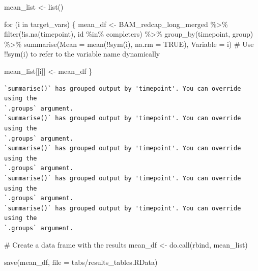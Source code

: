 \documentclass[
  letterpaper,
  DIV=11,
  numbers=noendperiod]{scrreprt}
\newenvironment{Shaded}{\begin{snugshade}}{\end{snugshade}}
\newcommand{\AttributeTok}[1]{\textcolor[rgb]{0.40,0.45,0.13}{#1}}
\newcommand{\CommentTok}[1]{\textcolor[rgb]{0.37,0.37,0.37}{#1}}
\newcommand{\ConstantTok}[1]{\textcolor[rgb]{0.56,0.35,0.01}{#1}}
\newcommand{\ControlFlowTok}[1]{\textcolor[rgb]{0.00,0.23,0.31}{#1}}
\newcommand{\FunctionTok}[1]{\textcolor[rgb]{0.28,0.35,0.67}{#1}}
\newcommand{\NormalTok}[1]{\textcolor[rgb]{0.00,0.23,0.31}{#1}}
\newcommand{\OtherTok}[1]{\textcolor[rgb]{0.00,0.23,0.31}{#1}}
\newcommand{\SpecialCharTok}[1]{\textcolor[rgb]{0.37,0.37,0.37}{#1}}
\newcommand{\StringTok}[1]{\textcolor[rgb]{0.13,0.47,0.30}{#1}}
\begin{document}
\begin{Shaded}
\begin{Highlighting}[]
\NormalTok{mean\_list }\OtherTok{\textless{}{-}} \FunctionTok{list}\NormalTok{()}

\ControlFlowTok{for}\NormalTok{ (i }\ControlFlowTok{in}\NormalTok{ target\_vars) \{ }
\NormalTok{  mean\_df }\OtherTok{\textless{}{-}}\NormalTok{ BAM\_redcap\_long\_merged }\SpecialCharTok{\%\textgreater{}\%}
    \FunctionTok{filter}\NormalTok{(}\SpecialCharTok{!}\FunctionTok{is.na}\NormalTok{(timepoint), id }\SpecialCharTok{\%in\%}\NormalTok{ completers) }\SpecialCharTok{\%\textgreater{}\%}
    \FunctionTok{group\_by}\NormalTok{(timepoint, group) }\SpecialCharTok{\%\textgreater{}\%}
    \FunctionTok{summarise}\NormalTok{(}\AttributeTok{Mean =} \FunctionTok{mean}\NormalTok{(}\SpecialCharTok{!!}\FunctionTok{sym}\NormalTok{(i), }\AttributeTok{na.rm =} \ConstantTok{TRUE}\NormalTok{), }\AttributeTok{Variable =}\NormalTok{ i)  }\CommentTok{\# Use !!sym(i) to refer to the variable name dynamically}
    
\NormalTok{  mean\_list[[i]] }\OtherTok{\textless{}{-}}\NormalTok{ mean\_df}
\NormalTok{\}}
\end{Highlighting}
\end{Shaded}

\begin{verbatim}
`summarise()` has grouped output by 'timepoint'. You can override using the
`.groups` argument.
`summarise()` has grouped output by 'timepoint'. You can override using the
`.groups` argument.
`summarise()` has grouped output by 'timepoint'. You can override using the
`.groups` argument.
`summarise()` has grouped output by 'timepoint'. You can override using the
`.groups` argument.
`summarise()` has grouped output by 'timepoint'. You can override using the
`.groups` argument.
\end{verbatim}

\begin{Shaded}
\begin{Highlighting}[]
\CommentTok{\# Create a data frame with the results}
\NormalTok{mean\_df }\OtherTok{\textless{}{-}} \FunctionTok{do.call}\NormalTok{(rbind, mean\_list)}

\FunctionTok{save}\NormalTok{(mean\_df, }\AttributeTok{file =} \StringTok{\textquotesingle{}tabs/results\_tables.RData\textquotesingle{}}\NormalTok{)}
\end{Highlighting}
\end{Shaded}
\end{document}
